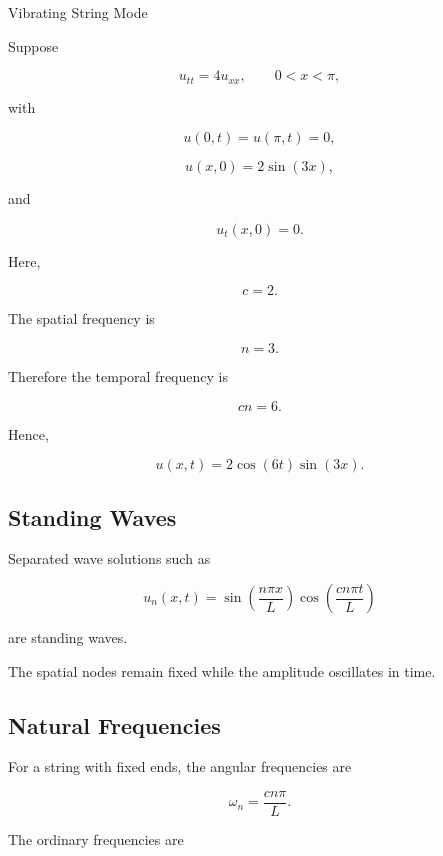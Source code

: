 \begin{workedexamplebox}{Vibrating String Mode}

Suppose

\[
u_{tt}
=
4u_{xx},
\qquad
0<x<\pi,
\]

with

\[
u(0,t)=u(\pi,t)=0,
\]

\[
u(x,0)=2\sin(3x),
\]

and

\[
u_t(x,0)=0.
\]

Here,

\[
c=2.
\]

The spatial frequency is

\[
n=3.
\]

Therefore the temporal frequency is

\[
cn=6.
\]

Hence,

\begin{answerbox}
\[
\boxed{
u(x,t)
=
2\cos(6t)\sin(3x).
}
\]
\end{answerbox}

\end{workedexamplebox}

\subsection{Standing Waves}
\label{subsec:standing-waves}

Separated wave solutions such as

\[
\boxed{
u_n(x,t)
=
\sin
\left(
\frac{n\pi x}{L}
\right)
\cos
\left(
\frac{cn\pi t}{L}
\right)
}
\]

are standing waves.

The spatial nodes remain fixed while the amplitude oscillates in time.

\subsection{Natural Frequencies}
\label{subsec:wave-natural-frequencies}

For a string with fixed ends, the angular frequencies are

\[
\boxed{
\omega_n
=
\frac{
cn\pi
}{
L
}.
}
\]

The ordinary frequencies are

